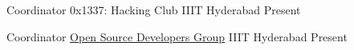 
\begin{cventries}
  \cventry
    {Coordinator} %
    {0x1337: Hacking Club} %
    {IIIT Hyderabad} %
    {Present} %
    {
    }


  \cventry
    {Coordinator} %
    {\href{https://osdg.iiit.ac.in/}{Open Source Developers Group}} %
    {IIIT Hyderabad} %
    {Present} %
    {
    }
\end{cventries}
